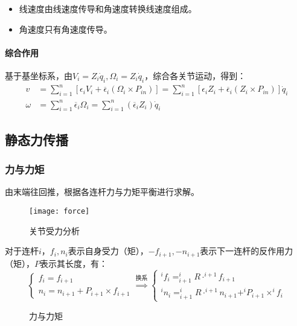 \documentclass[
12pt, %
a4paper, 
oneside, %
headinclude,footinclude, %
]{scrartcl}
\begin{document}
\begin{itemize}
\item 线速度由线速度传导和角速度转换线速度组成。
\item 角速度只有角速度传导。
\end{itemize} 
\paragraph{综合作用}
基于基坐标系，由$ V_i = Z_i \dot{q}_i, \Omega_i = Z_i \dot{q}_i $，综合各关节运动，得到：
\begin{align*}
v &= \sum_{i = 1}^n [\epsilon_i V_i + \overline{\epsilon}_i (\Omega_i \times P_{in})] = \sum_{i = 1}^n [\epsilon_i Z_i + \overline{\epsilon}_i (Z_i \times P_{in})] \dot{q}_i \\
\omega &= \sum_{i = 1}^n \overline{\epsilon}_i \Omega_i = \sum_{i = 1}^n (\overline{\epsilon}_i Z_i) \dot{q}_i
\end{align*}
\subsection{静态力传播}
\subsubsection{力与力矩}\label{sec:fn}
由末端往回推，根据各连杆力与力矩平衡进行求解。

\begin{figure}[H]
\centering 
\texttt{[image: force]} 
\caption[关节受力分析]{关节受力分析}
\end{figure}

对于连杆$ i $，$ f_i, n_i $表示自身受力（矩），$ -f_{i + 1}, -n_{i + 1} $表示下一连杆的反作用力（矩），$ P $表示其长度，有：
$$
\begin{cases}
f_i = f_{i + 1} \\
n_i = n_{i + 1} + P_{i + 1} \times f_{i + 1}
\end{cases}
\overset{\text{换系}}{\Longrightarrow}
\begin{cases}
^i f_i = ^i_{i + 1}R \cdot ^{i + 1} f_{i + 1} \\
^i n_i = ^i_{i + 1}R \cdot ^{i + 1} n_{i + 1} + ^i P_{i + 1} \times ^i f_i
\end{cases}
$$

\begin{figure}[H]
\centering
{} \quad
{}
\caption[力与力矩]{力与力矩}
\end{figure}
\end{document}
